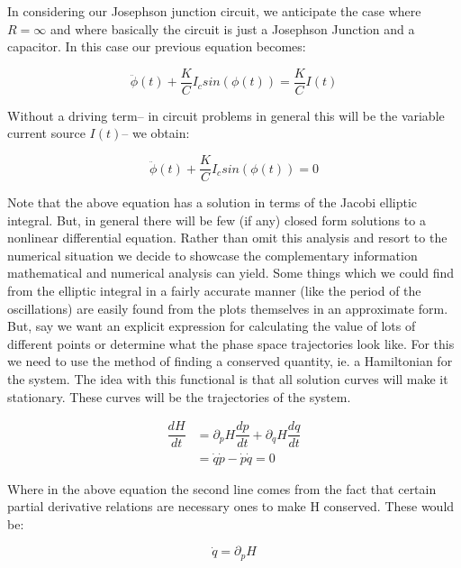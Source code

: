 \documentclass[12pt]{article}
\begin{document}
In considering our Josephson junction circuit, we anticipate the case where $R = \infty$ and where basically the circuit is just a Josephson Junction and a capacitor.  In this case our previous equation becomes:

\begin{equation}
\ddot{\phi}(t) + \dfrac{K}{C} I_c sin(\phi(t)) = \dfrac{K}{C} I(t)
\end{equation}

Without a driving term-- in circuit problems in general this will be the variable current source $I(t)$-- we obtain:

\begin{equation}
\ddot{\phi}(t) + \dfrac{K}{C} I_c sin(\phi(t)) = 0
\end{equation}

Note that the above equation has a solution in terms of the Jacobi elliptic integral.  But, in general there will be few (if any) closed form solutions to a nonlinear differential equation.  Rather than omit this analysis and resort to the numerical situation we decide to showcase the complementary information mathematical and numerical analysis can yield.  Some things which we could find from the elliptic integral in a fairly accurate manner (like the period of the oscillations) are easily found from the plots themselves in an approximate form.  But, say we want an explicit expression for calculating the value of lots of different points or determine what the phase space trajectories look like.  For this we need to use the method of finding a conserved quantity, ie. a Hamiltonian for the system.  The idea with this functional is that all solution curves will make it stationary.  These curves will be the trajectories of the system.

\begin{equation}
\begin{split}
\dfrac{dH}{dt} & = \partial_{p} H \dfrac{dp}{dt} +
\partial_{q} H \dfrac{dq}{dt} \\ 
& = \dot{q} \dot{p} - \dot{p} \dot{q}  = 0
\end{split}
\end{equation}

Where in the above equation the second line comes from the fact that certain partial derivative relations are necessary ones to make H conserved. These would be:

\begin{equation}
\dot{q} = \partial_{p} H
\end{equation}
\end{document}
